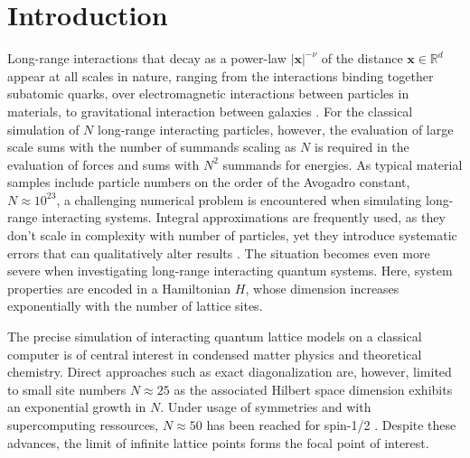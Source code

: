 \documentclass[]{amsart}
\numberwithin{mythm}{section}
\begin{document}
\maketitle

\section{Introduction}

Long-range interactions that decay as a power-law $|\bm x|^{-\nu}$ of the distance $\bm x\in \mathds R^d$ appear at all scales in nature, ranging from the interactions binding together subatomic quarks, over electromagnetic interactions between particles in materials, to gravitational interaction between galaxies \cite{campa2014physics}. For the classical simulation of $N$ long-range interacting particles, however, the evaluation of large scale sums with the number of summands scaling as $N$ is required in the evaluation of forces and sums with $N^2$ summands for energies. As typical material samples include particle numbers on the order of the Avogadro constant, $N\approx 10^{23}$, a challenging numerical problem is encountered when simulating long-range interacting systems. Integral approximations are frequently used, as they don't scale in complexity with number of particles, yet they introduce systematic errors that can qualitatively alter results \cite{buchheit2023exact}.  The situation becomes even more severe when investigating long-range interacting quantum systems. Here, system properties are encoded in a Hamiltonian $H$, whose dimension increases exponentially with the number of lattice sites. 

The precise simulation of interacting quantum lattice models on a classical computer is of central interest in condensed matter physics and theoretical chemistry. Direct approaches such as exact diagonalization are, however, limited to small site numbers $N\approx 25$ as the associated Hilbert space dimension exhibits an exponential growth in $N$. Under usage of symmetries and with supercomputing ressources, $N\approx 50$ has been reached for spin-1/2 \cite{Wietek2018}. Despite these advances, the limit of infinite lattice points forms the focal point of interest. 
\end{document}
